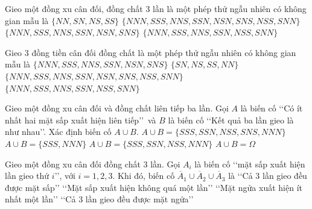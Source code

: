 \begin{ex}%
	Gieo một đồng xu cân đối, đồng chất $3$ lần là  một phép thử ngẫu nhiên có không gian mẫu là
	\choice 
		{$\{NN,SN,NS,SS\}$} 
		{\True  $\{NNN,SSS,NNS,SSN,NSN,SNS,NSS,SNN\}$}
		 {$\{NNN,SSS,NNS,SSN,NSN,SNS\}$}
		 {$\{NNN,SSS,NNS,SSN,NSS,SNN\}$}
\end{ex}

\begin{ex}%
	Gieo $3$ đồng tiền cân đối đồng chất  là một phép thử ngẫu nhiên có không gian mẫu là
	 \choice
		 {$\{NNN,SSS,NNS,SSN,NSN,SNS\}$}
		 {$\{SN,NS,SS,NN\}$}
		{\True $\{NNN,SSS,NNS,SSN,NSN,SNS,NSS,SNN\}$} 
		 {$\{NNN,SSS,NNS,SSN,NSS,SNN\}$}
\end{ex}

\begin{ex}%
	Gieo một đồng xu cân đối và đồng chất liên tiếp ba lần. Gọi $A$ là biến cố \lq\lq Có ít nhất hai mặt sấp xuất hiện liên tiếp\rq\rq\ và $B$ là  biến cố \lq\lq Kết quả ba lần gieo là như nhau\rq\rq. Xác định biến cố $A\cup B$.
	\choice 
		{$A\cup B=\{SSS,SSN,NSS,SNS,NNN\}$} 
		{$A\cup B=\{SSS,NNN\}$} 
		 {\True $A\cup B=\{SSS,SSN,NSS,NNN\}$}
		{$A\cup B=\Omega$} 
\end{ex}

\begin{ex}%
	Gieo một đồng xu cân đối đồng chất $3$ lần. Gọi $A_i$ là biến cố \lq\lq mặt sấp xuất hiện lần gieo thứ $i$\rq\rq, với $i=1,2,3$. Khi đó, biến cố $\overline{A}_1\cup \overline{A}_2\cup  \overline{A}_3$ là
	\choice 
		{\lq\lq  Cả $3$ lần gieo đều được mặt sấp\rq\rq}
		{\lq\lq Mặt sấp xuất hiện không quá  một lần\rq\rq}
		{\True \lq\lq Mặt ngửa xuất hiện ít nhất một lần\rq\rq} 
		{\lq\lq  Cả $3$ lần gieo đều được mặt ngửa\rq\rq}
\end{ex}

